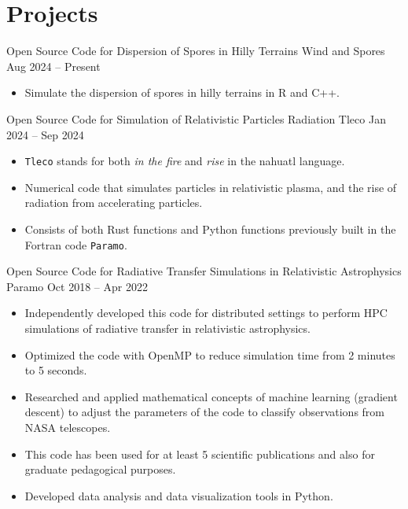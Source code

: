 \section{Projects}
%
{Open Source Code for Dispersion of Spores in Hilly Terrains}%
{Wind and Spores}%
{Aug 2024 -- Present}%
{}%
{%
\begin{itemize}
    \item Simulate the dispersion of spores in hilly terrains in R and C++.
\end{itemize}
}
%
{Open Source Code for Simulation of Relativistic Particles Radiation}%
{Tleco}%
{Jan 2024 -- Sep 2024}%
{}%
{%
\begin{itemize}
    \item \texttt{Tleco} stands for both \emph{in the fire} and \emph{rise} in the nahuatl language.
    \item Numerical code that simulates particles in relativistic plasma, and the rise of radiation from accelerating particles.
    \item Consists of both Rust functions and Python functions previously built in the Fortran code \texttt{Paramo}.
\end{itemize}
}
%
{Open Source Code for Radiative Transfer Simulations in Relativistic Astrophysics}%
{Paramo}%
{Oct 2018 -- Apr 2022}%
{}%
{%
\begin{itemize}
    \item Independently developed this code for distributed settings to perform HPC simulations of radiative transfer in relativistic astrophysics.
    \item Optimized the code with OpenMP to reduce simulation time from 2 minutes to 5 seconds.
    \item Researched and applied mathematical concepts of machine learning (gradient descent) to adjust the parameters of the code to classify observations from NASA telescopes.
    \item This code has been used for at least 5 scientific publications and also for graduate pedagogical purposes.
    \item Developed data analysis and data visualization tools in Python.
\end{itemize}
}
